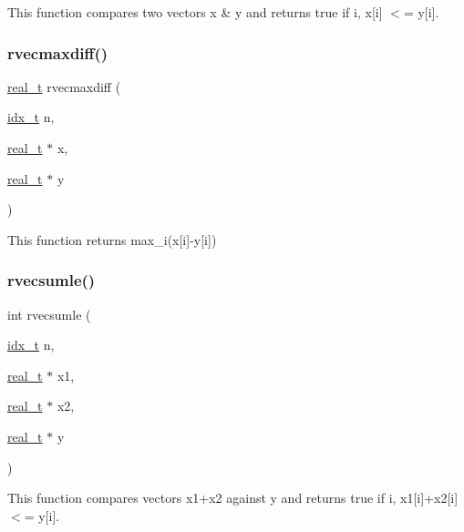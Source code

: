 This function compares two vectors x \& y and returns true if  i, x\mbox{[}i\mbox{]} $<$= y\mbox{[}i\mbox{]}. \mbox{\label{a00230_ad9d0577add9657973cd37030daf3eb1e}} 
\subsubsection{\texorpdfstring{rvecmaxdiff()}{rvecmaxdiff()}}
{\footnotesize\ttfamily \hyperlink{a00876_a1924a4f6907cc3833213aba1f07fcbe9}{real\+\_\+t} rvecmaxdiff (\begin{DoxyParamCaption}\item[{\hyperlink{a00876_aaa5262be3e700770163401acb0150f52}{idx\+\_\+t}}]{n,  }\item[{\hyperlink{a00876_a1924a4f6907cc3833213aba1f07fcbe9}{real\+\_\+t} $\ast$}]{x,  }\item[{\hyperlink{a00876_a1924a4f6907cc3833213aba1f07fcbe9}{real\+\_\+t} $\ast$}]{y }\end{DoxyParamCaption})}

This function returns max\+\_\+i(x\mbox{[}i\mbox{]}-\/y\mbox{[}i\mbox{]}) \mbox{\label{a00230_a28bf91b2a028cd146d6961a11252c2b8}} 
\subsubsection{\texorpdfstring{rvecsumle()}{rvecsumle()}}
{\footnotesize\ttfamily int rvecsumle (\begin{DoxyParamCaption}\item[{\hyperlink{a00876_aaa5262be3e700770163401acb0150f52}{idx\+\_\+t}}]{n,  }\item[{\hyperlink{a00876_a1924a4f6907cc3833213aba1f07fcbe9}{real\+\_\+t} $\ast$}]{x1,  }\item[{\hyperlink{a00876_a1924a4f6907cc3833213aba1f07fcbe9}{real\+\_\+t} $\ast$}]{x2,  }\item[{\hyperlink{a00876_a1924a4f6907cc3833213aba1f07fcbe9}{real\+\_\+t} $\ast$}]{y }\end{DoxyParamCaption})}

This function compares vectors x1+x2 against y and returns true if  i, x1\mbox{[}i\mbox{]}+x2\mbox{[}i\mbox{]} $<$= y\mbox{[}i\mbox{]}. 